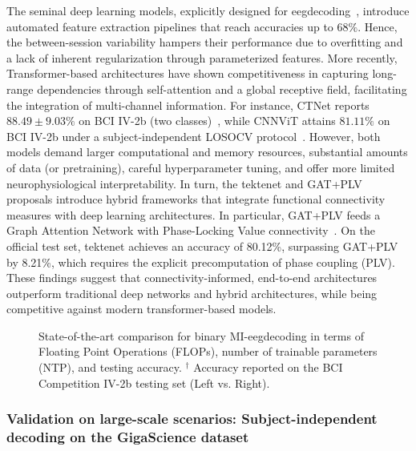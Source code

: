 The seminal deep learning models, explicitly designed for \gls{eeg}decoding~\cite{lawhern2018eegnet}, introduce automated feature extraction pipelines that reach accuracies up to $68\%$. Hence, the between-session variability hampers their performance due to overfitting and a lack of inherent regularization through parameterized features. More recently, Transformer-based architectures have shown competitiveness in capturing long-range dependencies through self-attention and a global receptive field, facilitating the integration of multi-channel information. For instance, CTNet reports $88.49\pm9.03\%$ on BCI IV-2b (two classes)~\cite{CTNet}, while CNNViT attains $81.11\%$ on BCI IV-2b under a subject-independent LOSOCV protocol~\cite{CNNViT}. However, both models demand larger computational and memory resources, substantial amounts of data (or pretraining), careful hyperparameter tuning, and offer more limited neurophysiological interpretability. In turn, the \gls{tektenet} and GAT+PLV proposals introduce hybrid frameworks that integrate functional connectivity measures with deep learning architectures. In particular, GAT+PLV feeds a Graph Attention Network with Phase-Locking Value connectivity~\cite{patel2025advancing}. On the official test set, \gls{tektenet} achieves an accuracy of 80.12\%, surpassing GAT+PLV by 8.21\%, which requires the explicit precomputation of phase coupling (PLV). These findings suggest that connectivity-informed, end-to-end architectures outperform traditional deep networks and hybrid architectures, while being competitive against modern transformer-based models.

\begin{figure}[H]
  \centering
  \resizebox{0.8\textwidth}{!}{}
  \caption{State-of-the-art comparison for binary MI-\gls{eeg}decoding in terms of Floating Point Operations (FLOPs), number of trainable parameters (NTP), and testing accuracy. $^{\dagger}$ Accuracy reported on the BCI Competition IV-2b testing set (Left vs. Right).}
  \label{tab:acc_comparisonn}
\end{figure}

\subsubsection{Validation on large-scale scenarios: Subject-independent decoding on the GigaScience dataset}

